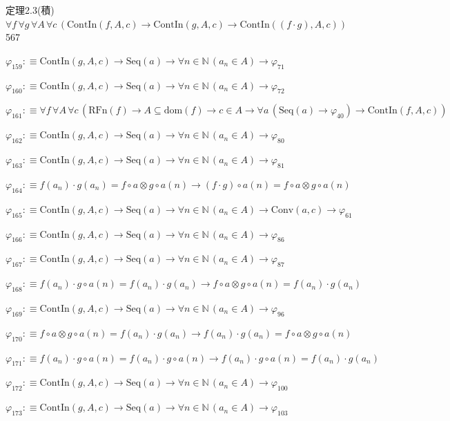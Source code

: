 \begin{fullproof}{定理2.3(積)}{$\forall f\,\forall g\,\forall A\,\forall c\,(\mathrm{ContIn}(f,A,c) \to \mathrm{ContIn}(g,A,c) \to \mathrm{ContIn}((f \cdot g),A,c))$}{567}
\begin{abbrevlist}
\item $\varphi_{159} :\equiv \mathrm{ContIn}(g,A,c) \to \mathrm{Seq}(a) \to \forall n \in \mathbb{N}\,(a_{n} \in A) \to \varphi_{71}$
\item $\varphi_{160} :\equiv \mathrm{ContIn}(g,A,c) \to \mathrm{Seq}(a) \to \forall n \in \mathbb{N}\,(a_{n} \in A) \to \varphi_{72}$
\item $\varphi_{161} :\equiv \forall f\,\forall A\,\forall c\,(\mathrm{RFn}(f) \to A \subseteq \mathrm{dom}(f) \to c \in A \to \forall a\,(\mathrm{Seq}(a) \to \varphi_{40}) \to \mathrm{ContIn}(f,A,c))$
\item $\varphi_{162} :\equiv \mathrm{ContIn}(g,A,c) \to \mathrm{Seq}(a) \to \forall n \in \mathbb{N}\,(a_{n} \in A) \to \varphi_{80}$
\item $\varphi_{163} :\equiv \mathrm{ContIn}(g,A,c) \to \mathrm{Seq}(a) \to \forall n \in \mathbb{N}\,(a_{n} \in A) \to \varphi_{81}$
\item $\varphi_{164} :\equiv f(a_{n}) \cdot g(a_{n}) = f \circ a \otimes g \circ a(n) \to (f \cdot g) \circ a(n) = f \circ a \otimes g \circ a(n)$
\item $\varphi_{165} :\equiv \mathrm{ContIn}(g,A,c) \to \mathrm{Seq}(a) \to \forall n \in \mathbb{N}\,(a_{n} \in A) \to \mathrm{Conv}(a,c) \to \varphi_{61}$
\item $\varphi_{166} :\equiv \mathrm{ContIn}(g,A,c) \to \mathrm{Seq}(a) \to \forall n \in \mathbb{N}\,(a_{n} \in A) \to \varphi_{86}$
\item $\varphi_{167} :\equiv \mathrm{ContIn}(g,A,c) \to \mathrm{Seq}(a) \to \forall n \in \mathbb{N}\,(a_{n} \in A) \to \varphi_{87}$
\item $\varphi_{168} :\equiv f(a_{n}) \cdot g \circ a(n) = f(a_{n}) \cdot g(a_{n}) \to f \circ a \otimes g \circ a(n) = f(a_{n}) \cdot g(a_{n})$
\item $\varphi_{169} :\equiv \mathrm{ContIn}(g,A,c) \to \mathrm{Seq}(a) \to \forall n \in \mathbb{N}\,(a_{n} \in A) \to \varphi_{96}$
\item $\varphi_{170} :\equiv f \circ a \otimes g \circ a(n) = f(a_{n}) \cdot g(a_{n}) \to f(a_{n}) \cdot g(a_{n}) = f \circ a \otimes g \circ a(n)$
\item $\varphi_{171} :\equiv f(a_{n}) \cdot g \circ a(n) = f(a_{n}) \cdot g \circ a(n) \to f(a_{n}) \cdot g \circ a(n) = f(a_{n}) \cdot g(a_{n})$
\item $\varphi_{172} :\equiv \mathrm{ContIn}(g,A,c) \to \mathrm{Seq}(a) \to \forall n \in \mathbb{N}\,(a_{n} \in A) \to \varphi_{100}$
\item $\varphi_{173} :\equiv \mathrm{ContIn}(g,A,c) \to \mathrm{Seq}(a) \to \forall n \in \mathbb{N}\,(a_{n} \in A) \to \varphi_{103}$

\end{abbrevlist}
\end{fullproof}
